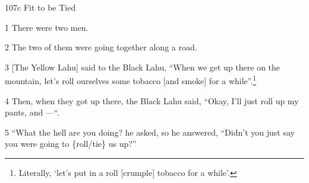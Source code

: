 
107c Fit to be Tied

1 There were two men.

2 The two of them were going together along a road.

3 [The Yellow Lahu] said to the Black Lahu, ``When we get up there on the mountain,
let's roll ourselves some tobacco [and smoke] for a while''.\footnote{Literally, `let's put in a roll [crumple] tobacco for a while'.}

4 Then, when they got up there, the Black Lahu said, ``Okay, I'll just roll up
my pants, and ---``.

5 ``What the hell are you doing? he asked, so he answered, ``Didn't you just say
you were going to \{roll/tie\} us up?''

